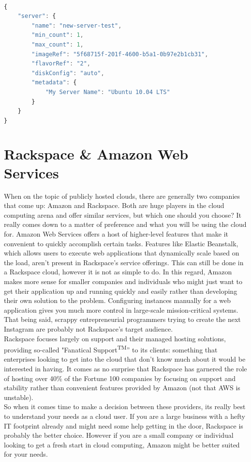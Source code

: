 \documentclass[DIV=calc, paper=letter, fontsize=12pt, twocolumn]{scrartcl}	 %
\begin{document}
\vfill

\pagebreak

\begin{lstlisting}[language={JavaScript},caption={A JSON object directing the Rackspace API to create a new Ubuntu server.},label={code:sample}]

{
    "server": {
        "name": "new-server-test",
        "min_count": 1,
        "max_count": 1,
        "imageRef": "5f68715f-201f-4600-b5a1-0b97e2b1cb31",
        "flavorRef": "2",
        "diskConfig": "auto",
        "metadata": {
            "My Server Name": "Ubuntu 10.04 LTS"
        }
    }
}

\end{lstlisting}

\section*{Rackspace \& Amazon Web Services}

When on the topic of publicly hosted clouds, there are generally two
companies that come up: Amazon and Rackspace. Both are huge players
in the cloud computing arena and offer similar services, but which one 
should you choose? It really comes down to a matter of preference and
what you will be using the cloud for. Amazon Web Services offers a host
of higher-level features that make it convenient to quickly accomplish
certain tasks. Features like Elastic Beanstalk, which allows users to
execute web applications that dynamically scale based on the load, aren't
present in Rackspace's service offerings. This can still be done in
a Rackspace cloud, however it is not as simple to do. In this regard,
Amazon makes more sense for smaller companies and individuals who might
just want to get their application up and running quickly and easily
rather than developing their own solution to the problem. Configuring
instances manually for a web application gives you much more control in
large-scale mission-critical systems. That being said, scrappy 
entrepreneurial programmers trying to create the next Instagram are probably
not Rackspace's target audience.
\\
Rackspace focuses largely on support
and their managed hosting solutions, providing so-called "Fanatical
Support\textsuperscript{TM}'' to its clients: something that enterprises looking to
get into the cloud that don't know much about it would be interested
in having. It comes as no surprise that Rackspace has garnered the role
of hosting over 40\% of the Fortune 100 companies\cite{ref:rackspaceMain} by focusing on 
support and stability rather than convenient features provided by
Amazon (not that AWS is unstable).
\\
So when it comes time to make a decision
between these providers, its really best to understand your needs as
a cloud user. If you are a large business with a hefty IT footprint
already and might need some help getting in the door, Rackspace is probably
the better choice. However if you are a small company or individual
looking to get a fresh start in cloud computing, Amazon might be better
suited for your needs.
\end{document}
